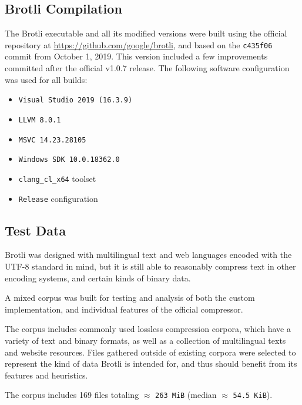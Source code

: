 \documentclass[english,master,dept460,male,cpp,cpdeclaration]{diploma}
\newcommand{\nosep}{\itemsep0em}
\begin{document}
	\bigskip
	\noindent
	
	\subsection{Brotli Compilation}
	\label{sec:brotli-compilation}
	
	The Brotli executable and all its modified versions were built using the official repository at \url{https://github.com/google/brotli}, and based on the \verb|c435f06| commit from October 1, 2019. This version included a few improvements committed after the official v1.0.7 release. The following software configuration was used for all builds:
	
	\begin{itemize} \nosep
		\item \verb|Visual Studio 2019 (16.3.9)|
		\item \verb|LLVM 8.0.1|
		\item \verb|MSVC 14.23.28105|
		\item \verb|Windows SDK 10.0.18362.0|
		\item \verb|clang_cl_x64| toolset
		\item \verb|Release| configuration
	\end{itemize}
	
	\subsection{Test Data}
	
	Brotli was designed with multilingual text and web languages encoded with the UTF-8 standard in mind, but it is still able to reasonably compress text in other encoding systems, and certain kinds of binary data.
	
	A mixed corpus was built for testing and analysis of both the custom implementation, and individual features of the official compressor.
	
	The corpus includes commonly used lossless compression corpora, which have a variety of text and binary formats, as well as a collection of multilingual texts and website resources. Files gathered outside of existing corpora were selected to represent the kind of data Brotli is intended for, and thus should benefit from its features and heuristics.
	
	The corpus includes 169 files totaling $\approx$ \verb|263 MiB| (median $\approx$ \verb|54.5 KiB|). 
	
\end{document}
